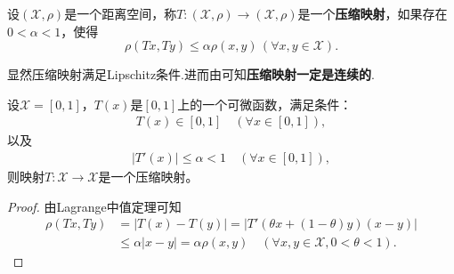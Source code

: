 \documentclass[../../main.tex]{subfiles}
\begin{document}
\begin{definition}
设$(\mathscr{X},\rho)$是一个距离空间，称$T:(\mathscr{X},\rho) \to (\mathscr{X},\rho)$是一个\textbf{压缩映射}，如果存在$0 < \alpha < 1$，使得$$\rho(Tx,Ty) \leqslant \alpha\rho(x,y)\,(\forall x,y \in \mathscr{X}).$$
\end{definition}
\begin{note}
显然压缩映射满足Lipschitz条件.进而由可知\textbf{压缩映射一定是连续的}.
\end{note}

\begin{example}
设$\mathscr{X} = [0,1]$，$T(x)$是$[0,1]$上的一个可微函数，满足条件：
\begin{align}
\label{eq:1.1.8}
T(x) \in [0,1] \quad (\forall x \in [0,1]),
\end{align}
以及
\begin{align}
\label{eq:1.1.9}
|T'(x)| \leqslant \alpha < 1 \quad (\forall x \in [0,1]),
\end{align}
则映射$T:\mathscr{X} \to \mathscr{X}$是一个压缩映射。
\end{example}
\begin{proof}
由Lagrange中值定理可知
\begin{align*}
\rho(Tx,Ty) &= |T(x) - T(y)|= |T'(\theta x + (1 - \theta)y)(x - y)| \\
&\leqslant \alpha|x - y| = \alpha\rho(x,y) \quad (\forall x,y \in \mathscr{X}, 0 < \theta < 1).
\end{align*}

\end{proof}
\end{document}
